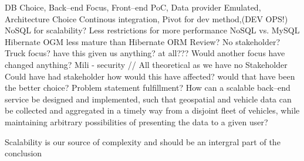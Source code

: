 DB Choice, Back--end Focus, Front--end PoC, Data provider Emulated, 
Architecture Choice
Continous integration, Pivot for dev method,(DEV OPS!)
NoSQL for scalability?
Less restrictions for more performance
NoSQL vs. MySQL
Hibernate OGM less mature than Hibernate ORM
Review?
No stakeholder?
Truck focus? have this given us anything? at all???
Would another focus have changed anything? Mili - security // All theoretical as we have no Stakeholder
Could have had stakeholder how would this have affected? would that have been the better choice?
Problem statement fulfillment?
How can a scalable back–end service be designed and implemented, such that geospatial
and vehicle data can be collected and aggregated in a timely way from a disjoint fleet
of vehicles, while maintaining arbitrary possibilities of presenting the data to a given user?

Scalability is our source of complexity and should be an intergral part of the conclusion